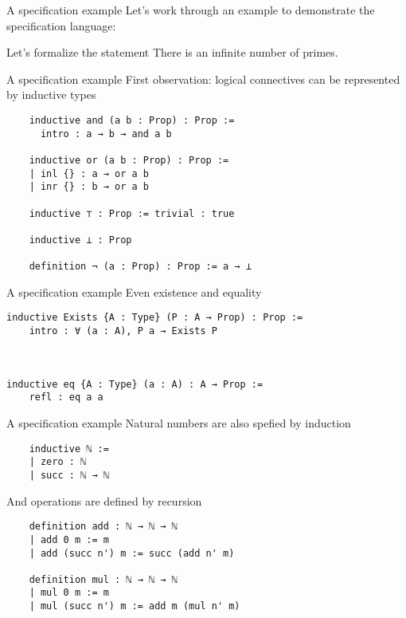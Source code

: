 \documentclass{beamer}
\begin{document}
\begin{frame}{A specification example}
  Let's work through an example to demonstrate the specification
  language:
  \begin{block}{Let's formalize the statement}
    There is an infinite number of primes.
  \end{block}
\end{frame}

\begin{frame}[fragile]{A specification example}
  First observation: logical connectives can be represented by
  inductive types
  \begin{lstlisting}
    inductive and (a b : Prop) : Prop :=
      intro : a → b → and a b

    inductive or (a b : Prop) : Prop :=
    | inl {} : a → or a b
    | inr {} : b → or a b

    inductive ⊤ : Prop := trivial : true

    inductive ⊥ : Prop

    definition ¬ (a : Prop) : Prop := a → ⊥

  \end{lstlisting}
  
\end{frame}
\begin{frame}[fragile]{A specification example}
  Even existence and equality
  \begin{lstlisting}
inductive Exists {A : Type} (P : A → Prop) : Prop :=
    intro : ∀ (a : A), P a → Exists P

    

inductive eq {A : Type} (a : A) : A → Prop :=
    refl : eq a a
  \end{lstlisting}
  
\end{frame}

\begin{frame}[fragile]{A specification example}
  Natural numbers are also spefied by induction
  \begin{lstlisting}
    inductive ℕ :=
    | zero : ℕ
    | succ : ℕ → ℕ
  \end{lstlisting}
  And operations are defined by recursion
  \begin{lstlisting}
    definition add : ℕ → ℕ → ℕ
    | add 0 m := m
    | add (succ n') m := succ (add n' m)

    definition mul : ℕ → ℕ → ℕ
    | mul 0 m := m
    | mul (succ n') m := add m (mul n' m)
  \end{lstlisting}
\end{frame}
\end{document}
